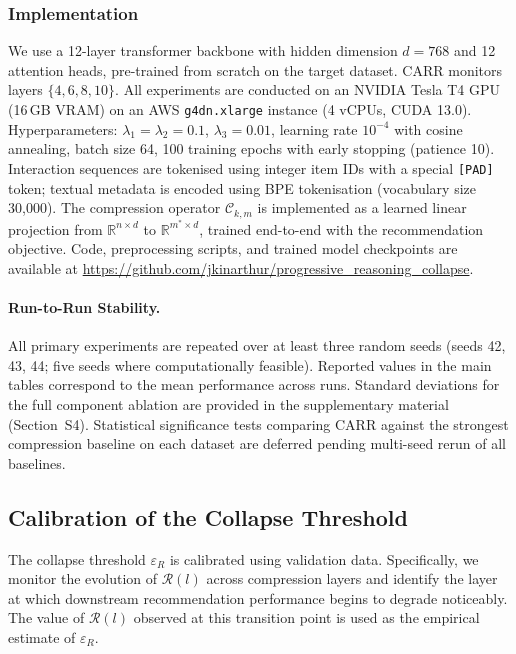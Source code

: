\documentclass[lettersize,journal]{IEEEtran}
\newcommand{\R}{\mathbb{R}}
\begin{document}
\subsubsection{Implementation}
We use a 12-layer transformer backbone with hidden dimension $d=768$ and 12 attention heads, pre-trained from scratch on the target dataset. CARR monitors layers $\{4, 6, 8, 10\}$. All experiments are conducted on an NVIDIA Tesla T4 GPU (16\,GB VRAM) on an AWS \texttt{g4dn.xlarge} instance (4 vCPUs, CUDA 13.0). Hyperparameters: $\lambda_1 = \lambda_2 = 0.1$, $\lambda_3 = 0.01$, learning rate $10^{-4}$ with cosine annealing, batch size 64, 100 training epochs with early stopping (patience 10). Interaction sequences are tokenised using integer item IDs with a special \texttt{[PAD]} token; textual metadata is encoded using BPE tokenisation (vocabulary size 30,000). The compression operator $\mathcal{C}_{k,m}$ is implemented as a learned linear projection from $\R^{n \times d}$ to $\R^{m^* \times d}$, trained end-to-end with the recommendation objective. Code, preprocessing scripts, and trained model checkpoints are available at \url{https://github.com/jkinarthur/progressive_reasoning_collapse}.

\paragraph{Run-to-Run Stability.}
All primary experiments are repeated over at least three random seeds (seeds 42, 43, 44; five seeds where computationally feasible). Reported values in the main tables correspond to the mean performance across runs. Standard deviations for the full component ablation are provided in the supplementary material (Section~S4). Statistical significance tests comparing CARR against the strongest compression baseline on each dataset are deferred pending multi-seed rerun of all baselines.

\subsection{Calibration of the Collapse Threshold}

The collapse threshold $\varepsilon_R$ is calibrated using validation data. Specifically, we monitor the evolution of $\mathcal{R}(l)$ across compression layers and identify the layer at which downstream recommendation performance begins to degrade noticeably. The value of $\mathcal{R}(l)$ observed at this transition point is used as the empirical estimate of $\varepsilon_R$.
\end{document}
